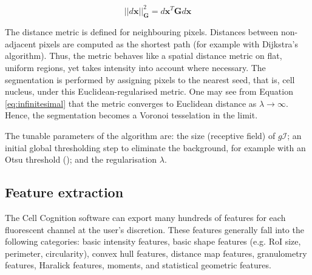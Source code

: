 \begin{equation}
||d\mathbf{x}||_{\mathbf{G}}^2 = d\mathbf{x}^T\mathbf{G}d\mathbf{x}
\label{eq:infinitesimal}
\end{equation}

The distance metric is defined for neighbouring pixels. Distances between non-adjacent pixels are computed as the shortest path (for example with Dijkstra's algorithm). Thus, the metric behaves like a spatial distance metric on flat, uniform regions, yet takes intensity into account where necessary. The segmentation is performed by assigning pixels to the nearest seed, that is, cell nucleus, under this Euclidean-regularised metric. One may see from Equation \ref{eq:infinitesimal} that the metric converges to Euclidean distance as $\lambda \to \infty$. Hence, the segmentation becomes a Voronoi tesselation in the limit. 

The tunable parameters of the algorithm are: the size (receptive field) of $g\mathcal{I}$; an initial global thresholding step to eliminate the background, for example with an Otsu threshold (\cite{otsu1979threshold}); and the regularisation $\lambda$.

\subsection{Feature extraction}

The Cell Cognition software can export many hundreds of features for each fluorescent channel at the user's discretion. These features generally fall into the following categories: basic intensity features, basic shape features (e.g. RoI size, perimeter, circularity), convex hull features, distance map features, granulometry features, Haralick features, moments, and statistical geometric features.

%

